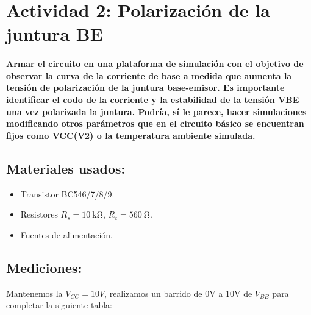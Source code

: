 \newpage

\section{Actividad 2: Polarización de la juntura BE}

\paragraph{Armar el circuito en una plataforma de simulación con el objetivo de observar la curva de la corriente de base a medida que aumenta la tensión de polarización de la juntura base-emisor. Es importante identificar el codo de la corriente y la estabilidad de la tensión VBE una vez polarizada la juntura. Podría, sí le parece, hacer simulaciones modificando otros parámetros que en el circuito básico se encuentran fijos como VCC(V2) o la temperatura ambiente simulada.}



\subsection{Materiales usados:}
\begin{itemize}
    \item Transistor BC546/7/8/9.
    \item Resistores $R_s = \SI{10}{\kilo\ohm}$, $R_c = \SI{560}{\ohm}$.
    \item Fuentes de alimentación.
\end{itemize}


\subsection{Mediciones:}
Mantenemos la $V_{CC} = 10V$, realizamos un barrido de 0V a 10V de $V_{BB}$ para completar la siguiente tabla:

\begin{table}[ht]
\end{table}

